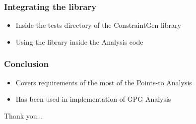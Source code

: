 \documentclass{beamer}
\begin{document}
\begin{frame}
\frametitle{Integrating the library}

\begin{itemize}
    \item<1-> Inside the tests directory of the ConstraintGen library
    \item<2-> Using the library inside the Analysis code
\end{itemize}

\end{frame}

\begin{frame}
\frametitle{Conclusion}
\begin{itemize}
    \item<1-> Covers requirements of the most of the Points-to Analysis
    \item<2-> Has been used in implementation of GPG Analysis
\end{itemize}
\end{frame}

\begin{frame}

\huge Thank you...
\end{frame}
\end{document}
